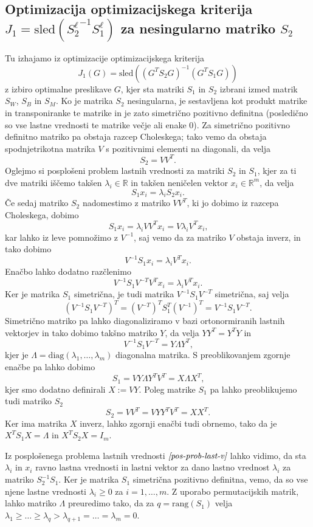 \documentclass[mat1]{article}
\begin{document}
\subsection{Optimizacija optimizacijskega kriterija $J_1 = \text{sled}({S^\ell_2}^{-1} S^\ell_1)$ za nesingularno matriko $S_2$}
Tu izhajamo iz optimizacije optimizacijskega kriterija 
$$J_1(G) = \text{sled}\left((G^T S_2 G)^{-1} (G^T S_1 G)\right)$$
z izbiro optimalne preslikave $G$, kjer sta matriki $S_1$ in $S_2$ izbrani izmed matrik $S_W$, $S_B$ in $S_M$. Ko je matrika $S_2$ nesingularna, je sestavljena kot produkt matrike in transponiranke te matrike in je zato simetrično pozitivno definitna (posledično so vse lastne vrednosti te matrike večje ali enake 0). Za simetrično pozitivno definitno matriko pa obstaja razcep Choleskega; tako vemo da obstaja spodnjetrikotna matrika $V$ s pozitivnimi elementi na diagonali, da velja
$$ S_2 = V V^T \text{.}
$$
Oglejmo si posplošeni problem lastnih vrednosti za matriki $S_2$ in $S_1$, kjer za ti dve matriki iščemo takšen $\lambda_i \in \mathbb{R}$ in takšen neničelen vektor $x_i \in \mathbb{R}^m$, da velja
\begin{equation} \label{pos-prob-last-v}
S_1 x_i = \lambda_i S_2 x_i
\text{.}
\end{equation}
Če sedaj matriko $S_2$ nadomestimo z matriko $VV^T$, ki jo dobimo iz razcepa Choleskega, dobimo
$$
S_1 x_i = \lambda_i V V^T x_i = V \lambda_i V^T x_i
\text{,}
$$
kar lahko iz leve pomnožimo z $V^{-1}$, saj vemo da za matriko $V$ obstaja inverz, in tako dobimo
$$
V^{-1} S_1 x_i = \lambda_i V^T x_i
\text{.}
$$
Enačbo lahko dodatno razčlenimo
$$
V^{-1} S_1 V^{-T} V^T x_i = \lambda_i V^T x_i
\text{.}
$$
Ker je matrika $S_1$ simetrična, je tudi matrika $V^{-1} S_1 V^{-T}$ simetrična, saj velja
$$
(V^{-1} S_1 V^{-T})^T =  (V^{-T})^T S_1^T (V^{-1})^T =  V^{-1} S_1 V^{-T}
\text{.}
$$
Simetrično matriko pa lahko diagonaliziramo v bazi ortonormiranih lastnih vektorjev in tako dobimo takšno matriko $Y$, da velja $Y Y^T = Y^T Y$ in 
$$
V^{-1} S_1 V^{-T} = Y \Lambda Y^T
\text{,}
$$
kjer je $\Lambda = \text{diag}\left(\lambda_1, \ldots, \lambda_m \right)$ diagonalna matrika. S preoblikovanjem zgornje enačbe pa lahko dobimo
$$
S_1 = VY \Lambda Y^TV^T = X \Lambda X^T
\text{,}
$$
kjer smo dodatno definirali $X := VY$.
Poleg matrike $S_1$ pa lahko preoblikujemo tudi matriko $S_2$
$$
S_2 = VV^T = VYY^TV^T = XX^T
\text{.}
$$
Ker ima matrika $X$ inverz, lahko zgornji enačbi tudi obrnemo, tako da je $X^T S_1 X = \Lambda$ in $X^T S_2 X = I_m$.

Iz posplošenega problema lastnih vrednosti $\textit{\eqref{pos-prob-last-v}}$ lahko vidimo, da sta $\lambda_i$ in $x_i$ ravno lastna vrednosti in lastni vektor za dano lastno vrednost $\lambda_i$ za matriko $S_2^{-1} S_1$. Ker je matrika $S_1$ simetrična pozitivno definitna, vemo, da so vse njene lastne vrednosti $\lambda_i \geq 0$ za $i = 1, \ldots, m$. Z uporabo permutacijskih matrik, lahko matriko $\Lambda$ preuredimo tako, da za  $q = \text{rang} \left( S_1 \right)$ velja $\lambda_1 \geq \ldots \geq \lambda_q > \lambda_{q+1} = \ldots = \lambda_m = 0$.
\end{document}
